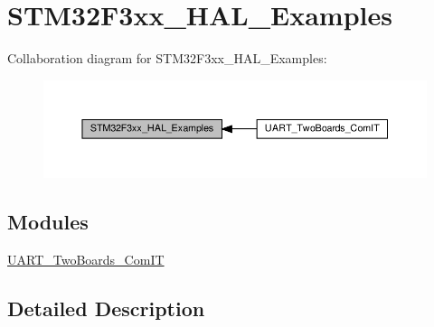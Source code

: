 \hypertarget{group__STM32F3xx__HAL__Examples}{}\section{S\+T\+M32\+F3xx\+\_\+\+H\+A\+L\+\_\+\+Examples}
\label{group__STM32F3xx__HAL__Examples}
Collaboration diagram for S\+T\+M32\+F3xx\+\_\+\+H\+A\+L\+\_\+\+Examples\+:\nopagebreak
\begin{figure}[H]
\begin{center}
\leavevmode
\includegraphics[width=350pt]{group__STM32F3xx__HAL__Examples}
\end{center}
\end{figure}
\subsection*{Modules}
\begin{DoxyCompactItemize}
\item 
\hyperlink{group__UART__TwoBoards__ComIT}{U\+A\+R\+T\+\_\+\+Two\+Boards\+\_\+\+Com\+IT}
\end{DoxyCompactItemize}


\subsection{Detailed Description}
